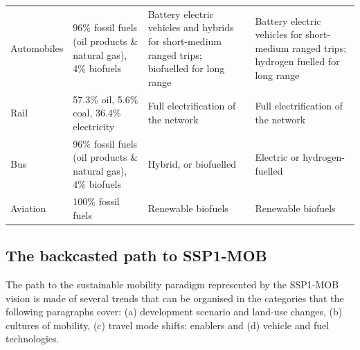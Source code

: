\begin{longtable}{p{2.5cm}p{4.5cm}p{4cm}p{4cm}}
Automobiles & 96\% fossil fuels (oil products \& natural gas), 4\% biofuels \parencite{iea2017_Statisticswebportal} & Battery electric vehicles and hybrids for short-medium ranged trips; biofuelled for long range & Battery electric vehicles for short-medium ranged trips; hydrogen fuelled for long range \\*
Rail & 57.3\% oil, 5.6\% coal, 36.4\% electricity \parencite{cazzola2016_RailwayHandbook2016} & Full electrification of the network & Full electrification of the network \\*
Bus & 96\% fossil fuels (oil products \& natural gas), 4\% biofuels \parencite{iea2017_Statisticswebportal} & Hybrid, or biofuelled & Electric or hydrogen-fuelled \\*
Aviation & 100\% fossil fuels \parencite{iea2017_Statisticswebportal} & Renewable biofuels & Renewable biofuels
\end{longtable}
\endgroup

\subsection{The backcasted path to SSP1-MOB}
\label{ss:results:backcasting-the-path}
The path to the sustainable mobility paradigm represented by the SSP1-MOB vision is made of several trends that can be organised in the categories that the following paragraphs cover: (a) development scenario and land-use changes, (b) cultures of mobility, (c) travel mode shifts: enablers and (d) vehicle and fuel technologies.


